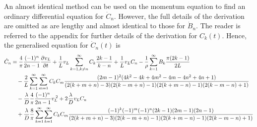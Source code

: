 
An almost identical method can be used on the momentum equation to find an ordinary differential equation for $\dot{C}_n$.
However, the full details of the derivation are omitted as are lengthy and almost identical to those for $\dot{B}_n$. The reader is referred to the appendix for further details of the derivation for $C_k(t)$.
Hence, the generalised equation for $\dot{C}_n(t)$ is
~ 
\begin{equation*}
\begin{split}
    \dot{C}_n &=
    \frac{4}{\pi} \frac{(-1)^n}{2n-1} \pdiff{v_L}{t}
    + \frac{1}{L} v_L \sum^{\infty}_{k=1,k \neq n} C_k \frac{2k-1}{k-n}
    + \frac{1}{L} v_L C_n
    - \frac{1}{\rho} \sum^{\infty}_{k=1} B_k \frac{\pi (2k-1)}{2L}
    \\ & \quad %
    - \frac{2}{L} \sum^{\infty}_{k=1} \sum^{\infty}_{m=1} C_k C_m \frac{
    (2m-1)^2 (4k^2 - 4k + 4m^2 - 4m - 4n^2 + 4n + 1)
    }{
    (2(k+m+n)-3)(2(k-m+n)-1)(2(k+m-n)-1)(2(k-m-n)+1)
    }
    \\ & \quad %
    - \frac{\lambda}{D} \frac{4}{\pi} \frac{(-1)^n}{2n-1} v_L\power{2}
    + 2 \frac{\lambda}{D} v_L C_n
    \\ & \quad %
    + \frac{\lambda}{D} \frac{8}{\pi} \sum^{\infty}_{k=1} \sum^{\infty}_{k=1} C_k C_m \frac{
    (-1)^k (-1)^m (-1)^n (2k-1) (2m-1) (2n-1)
    }{
    (2(k+m+n)-3)(2(k-m+n)-1)(2(k+m-n)-1)(2(k-m-n)+1)
    }
\end{split}
\end{equation*}

